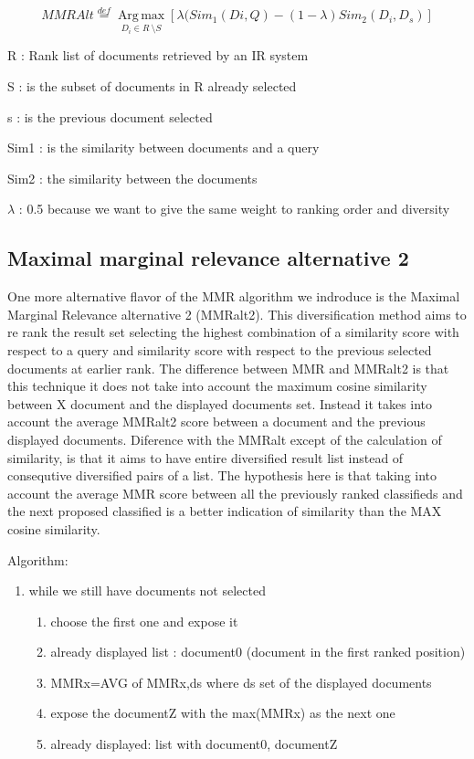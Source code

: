 \begin{equation}
MMRAlt\overset{def}{=}\operatorname*{Arg \, \max}_{D_{i}\in R\ \setminus S}[\lambda(Sim_{1}(Di,Q)-(1-\lambda) Sim_{2}(D_{i},D_{s})]
\end{equation}

R : Rank list of documents retrieved by an IR system

S : is the subset of documents in R already selected

s : is the previous document selected

Sim1 : is the similarity between documents and a query

Sim2 : the similarity between the documents

$\lambda$ : 0.5 because we want to give the same weight to ranking order and diversity



\subsection{Maximal marginal relevance alternative 2}

One more alternative flavor of the MMR algorithm we indroduce is the Maximal Marginal Relevance alternative 2 (MMRalt2). This diversification method aims to re rank the result set selecting the highest combination of a similarity score with respect to a query and similarity score with respect to the previous selected documents at earlier rank. The difference between MMR and MMRalt2 is that this technique it does not take into account the maximum cosine similarity between X document and the displayed documents set. Instead it takes into account the average MMRalt2 score between a document and the previous displayed documents. Diference with the MMRalt except of the calculation of similarity, is that it aims to have entire diversified result list instead of consequtive diversified pairs of a list. The hypothesis here is that taking into account the average MMR score between all the previously ranked classifieds and the next proposed classified is a better indication of similarity than the MAX cosine similarity. 

Algorithm:

\begin{enumerate}
\item while we still have documents not selected
	\begin{enumerate}
	\item choose the first one and expose it
	\item already displayed list : document0 (document in the first ranked position)
	\item MMRx=AVG of MMRx,ds where ds set of the displayed documents
	\item expose the documentZ with the max(MMRx) as the next one
	\item already displayed: list with document0, documentZ
	\end{enumerate}
\end{enumerate}

